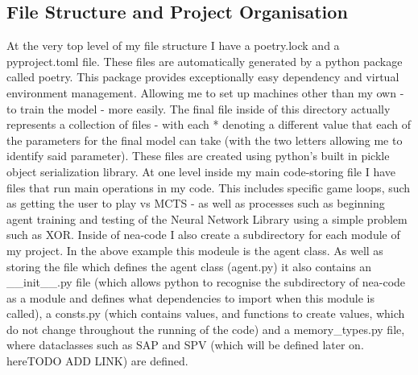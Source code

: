 \documentclass{article}
\begin{document}
    \subsection{File Structure and Project Organisation} \label{File-Structure}
    At the very top level of my file structure I have a poetry.lock and a pyproject.toml file. These files are automatically generated by
    a python package called poetry. This package provides exceptionally easy dependency and virtual environment management. Allowing me to
    set up machines other than my own - to train the model - more easily. 
    The final file inside of this directory actually represents a collection of files - with each * denoting a different value that each of the 
    parameters for the final model can take (with the two letters allowing me to identify said parameter). These files are created using python's built in pickle object serialization library.
    At one level inside my main code-storing file I have files that run main operations in my code. This includes specific game loops, such as getting the user to play 
    vs MCTS - as well as processes such as beginning agent training and testing of the Neural Network Library using a simple problem such as XOR.
    Inside of nea-code I also create a subdirectory for each module of my project. In the above example this modeule is the agent class. As well as storing the file which defines the agent class (agent.py)
    it also contains an \_\_init\_\_.py file (which allows python to recognise the subdirectory of nea-code as a module and defines what dependencies to import when this module is called), a consts.py (which contains
    values, and functions to create values, which do not change throughout the running of the code) and a memory_types.py file, where dataclasses such as SAP and SPV (which will be defined later on. hereTODO ADD LINK) are defined.
\end{document}

